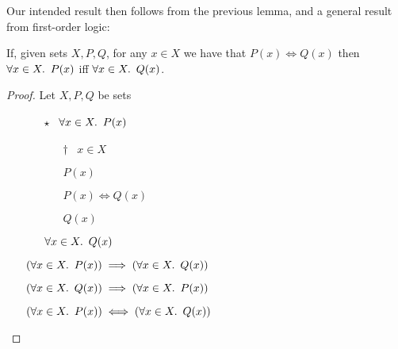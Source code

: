 Our intended result then follows from the previous lemma, and a general result from first-order logic:

\begin{lemma}\label{lemma:epic-preserve-2}
  If, given sets $X, P, Q$, for any $x\in X$ we have that ${P(x) \iff Q(x)}$ then $\forall x\in X\ldotp~P(x)$ iff $\forall x\in X\ldotp~Q(x)$.

  \begin{proof}
    Let $X, P, Q$ be sets
    \begin{itemize}
      \item[\phs]
        \begin{itemize}
          \item[$\star$]
            \Ass~$\forall x\in X\ldotp~P(x)$
            \marginnote{\Hyp}

          \item[\phs]
            \begin{itemize}
              \item[$\dagger$]
                \Let~$x\in X$
                \marginnote{\Hyp}

              \item[\phs]
                $P(x)$
                \marginnote{$\forall$-\Elim-$\star$}

              \item[\phs]
                $P(x)\iff Q(x)$

              \item[\imps]
                $Q(x)$
                \marginnote{\iffs-\Elim}
            \end{itemize}

            \item[\imps]
              $\forall x\in X\ldotp~Q(x)$
              \marginnote{$\forall$-\Intro-$\dagger$}
        \end{itemize}

      \item[\imps]
        $(\forall x\in X\ldotp~P(x))\implies(\forall x\in X\ldotp~Q(x))$
        \marginnote{\imps-\Intro-$\star$}
      \item[\phantom{\imps}]
        $(\forall x\in X\ldotp~Q(x))\implies(\forall x\in X\ldotp~P(x))$
      \item[\iffs]
        $(\forall x\in X\ldotp~P(x))\iff(\forall x\in X\ldotp~Q(x))$
        \qedhere
        \marginnote{\iffs-\Intro}
    \end{itemize}
  \end{proof}
\end{lemma}

